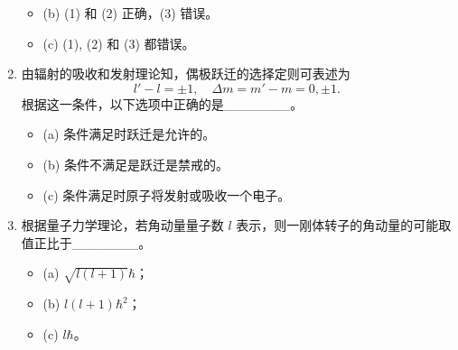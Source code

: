 \begin{enumerate}
\begin{itemize}
        \item (b) (1) 和 (2) 正确，(3) 错误。
        \item (c) (1), (2) 和 (3) 都错误。
    \end{itemize}
    \item 由辐射的吸收和发射理论知，偶极跃迁的选择定则可表述为\[
l' - l = \pm1, \quad \Delta m = m' - m = 0, \pm1.~\]
根据这一条件，以下选项中正确的是_______。
     \begin{itemize}
        \item (a) 条件满足时跃迁是允许的。
        \item (b) 条件不满足是跃迁是禁戒的。
        \item (c) 条件满足时原子将发射或吸收一个电子。
    \end{itemize}
    \item 根据量子力学理论，若角动量量子数 $l$ 表示，则一刚体转子的角动量的可能取值正比于_______。
         \begin{itemize}
        \item (a) $\sqrt{l(l+1)}\hbar$；
        \item (b) $l(l+1)\hbar^2$；
        \item (c) $l\hbar$。
    \end{itemize}
\end{enumerate}

